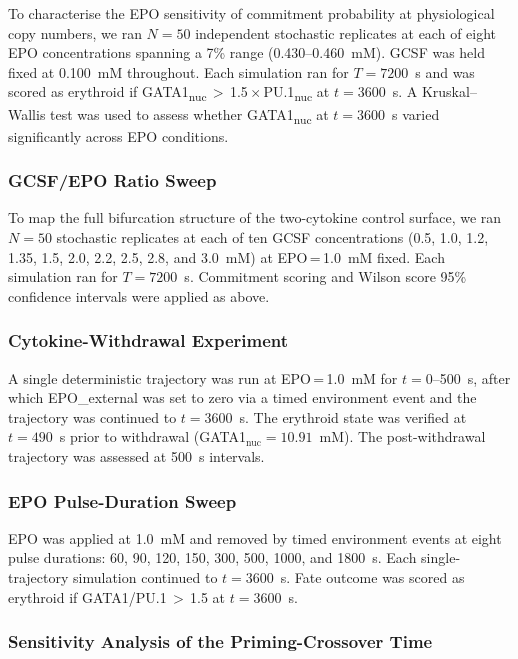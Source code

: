 To characterise the EPO sensitivity of commitment probability at physiological
copy numbers, we ran $N=50$ independent stochastic replicates at each of eight
EPO concentrations spanning a 7\% range (0.430--0.460~mM). GCSF was held fixed
at 0.100~mM throughout. Each simulation ran for $T=7200$~s and was scored as
erythroid if GATA1\textsubscript{nuc}\,$>$\,1.5\,$\times$\,PU.1\textsubscript{nuc}
at $t=3600$~s. A Kruskal--Wallis test was used to assess whether GATA1\textsubscript{nuc}
at $t=3600$~s varied significantly across EPO conditions.

\subsubsection*{GCSF/EPO Ratio Sweep}

To map the full bifurcation structure of the two-cytokine control surface, we
ran $N=50$ stochastic replicates at each of ten GCSF concentrations
(0.5, 1.0, 1.2, 1.35, 1.5, 2.0, 2.2, 2.5, 2.8, and 3.0~mM) at EPO\,=\,1.0~mM
fixed. Each simulation ran for $T=7200$~s. Commitment scoring and Wilson score
95\% confidence intervals were applied as above.

\subsubsection*{Cytokine-Withdrawal Experiment}

A single deterministic trajectory was run at EPO\,=\,1.0~mM for
$t=0$--500~s, after which EPO\_external was set to zero via a timed environment
event and the trajectory was continued to $t=3600$~s. The erythroid state was
verified at $t=490$~s prior to withdrawal (GATA1$_\text{nuc}=10.91$~mM). The
post-withdrawal trajectory was assessed at 500~s intervals.

\subsubsection*{EPO Pulse-Duration Sweep}

EPO was applied at 1.0~mM and removed by timed environment events at eight
pulse durations: 60, 90, 120, 150, 300, 500, 1000, and 1800~s. Each
single-trajectory simulation continued to $t=3600$~s. Fate outcome was scored
as erythroid if GATA1/PU.1\,$>$\,1.5 at $t=3600$~s.

\subsubsection*{Sensitivity Analysis of the Priming-Crossover Time}


